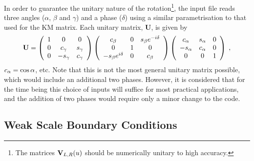 In order to guarantee the unitary nature of the rotation\footnote{The
matrices ${\bf V}_{L,R}(u)$ should be numerically unitary to high
accuracy.}, the input file reads three angles ($\alpha$, $\beta$ and
$\gamma$) and a phase ($\delta$) using a similar parametrisation to that
used for the KM matrix. Each unitary matrix, ${\mathbf{U}}$, is given by
%
\begin{equation}\label{eq:rotin} {\mathbf{U}}=\left(\begin{array}{ccc} 1
& 0 & 0 \\ 0 & c_{\gamma} &
s_{\gamma} \\ 0 & -s_{\gamma} & c_{\gamma} \\
\end{array}\right)
\left(\begin{array}{ccc}
c_{\beta} & 0 & s_{\beta}e^{-i\delta} \\ 0 & 1 & 0 \\
-s_{\beta}e^{i\delta} & 0 & c_{\beta} \\
\end{array}\right)
\left(\begin{array}{ccc}
c_{\alpha} & s_{\alpha} & 0 \\ -s_{\alpha} & c_{\alpha} & 0 \\ 0
& 0 & 1 \\
\end{array}\right)\;,
\end{equation} %
$c_{\alpha}=\cos{\alpha}$, etc. Note that this is not the most general
unitary matrix possible, which would include an additional two phases.
However, it is considered that for the time being this choice of inputs
will suffice for most practical applications, and the addition of two
phases would require only a minor change to the code.

\subsection{Weak Scale Boundary Conditions}

